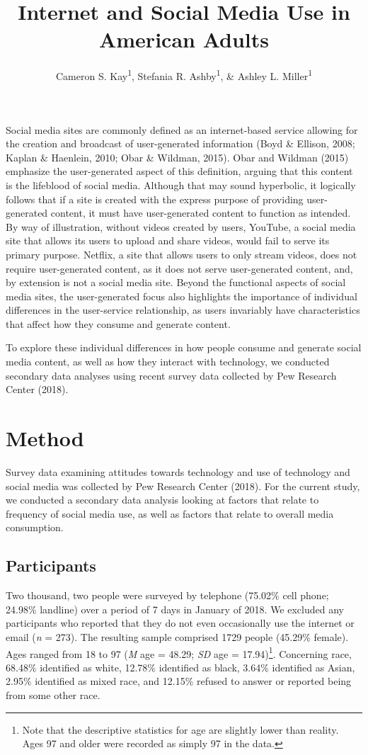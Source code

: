 \documentclass[man]{apa6}
\title{Internet and Social Media Use in American Adults}
\author{Cameron S. Kay\textsuperscript{1}, Stefania R. Ashby\textsuperscript{1},
\& Ashley L. Miller\textsuperscript{1}}
\date{}
\affiliation{
\vspace{0.5cm}
\textsuperscript{1} University of Oregon}
\let\rmarkdownfootnote\footnote%
\def\footnote{\protect\rmarkdownfootnote}
\theoremstyle{definition}
\theoremstyle{definition}
\theoremstyle{definition}
\theoremstyle{remark}
\begin{document}
\maketitle

Social media sites are commonly defined as an internet-based service
allowing for the creation and broadcast of user-generated information
(Boyd \& Ellison, 2008; Kaplan \& Haenlein, 2010; Obar \& Wildman,
2015). Obar and Wildman (2015) emphasize the user-generated aspect of
this definition, arguing that this content is the lifeblood of social
media. Although that may sound hyperbolic, it logically follows that if
a site is created with the express purpose of providing user-generated
content, it must have user-generated content to function as intended. By
way of illustration, without videos created by users, YouTube, a social
media site that allows its users to upload and share videos, would fail
to serve its primary purpose. Netflix, a site that allows users to only
stream videos, does not require user-generated content, as it does not
serve user-generated content, and, by extension is not a social media
site. Beyond the functional aspects of social media sites, the
user-generated focus also highlights the importance of individual
differences in the user-service relationship, as users invariably have
characteristics that affect how they consume and generate content.

To explore these individual differences in how people consume and
generate social media content, as well as how they interact with
technology, we conducted secondary data analyses using recent survey
data collected by Pew Research Center (2018).

\section{Method}\label{method}

Survey data examining attitudes towards technology and use of technology
and social media was collected by Pew Research Center (2018). For the
current study, we conducted a secondary data analysis looking at factors
that relate to frequency of social media use, as well as factors that
relate to overall media consumption.

\subsection{Participants}\label{participants}

Two thousand, two people were surveyed by telephone (75.02\% cell phone;
24.98\% landline) over a period of 7 days in January of 2018. We
excluded any participants who reported that they do not even
occasionally use the internet or email (\emph{n} = 273). The resulting
sample comprised 1729 people (45.29\% female). Ages ranged from 18 to 97
(\emph{M} age = 48.29; \emph{SD} age =
17.94)\footnote{Note that the descriptive statistics for age are slightly lower than reality. Ages 97 and older were recorded as simply 97 in the data.}.
Concerning race, 68.48\% identified as white, 12.78\% identified as
black, 3.64\% identified as Asian, 2.95\% identified as mixed race, and
12.15\% refused to answer or reported being from some other race.
\end{document}
